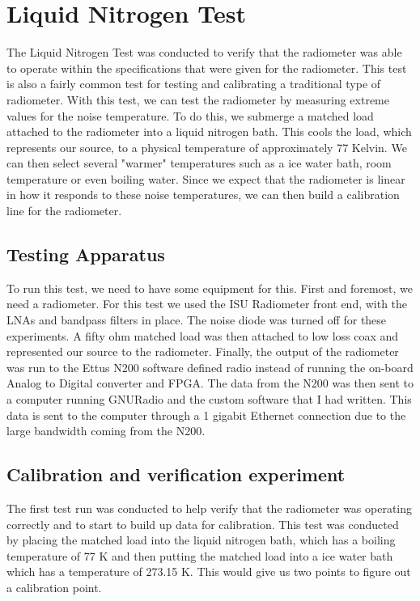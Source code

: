 \section{Liquid Nitrogen Test}
The Liquid Nitrogen Test was conducted to verify that the radiometer was able to operate within the specifications that were given for the radiometer.  This test is also a fairly common test for testing and calibrating a traditional type of radiometer.  With this test, we can test the radiometer by measuring extreme values for the noise temperature.  To do this, we submerge a matched load attached to the radiometer into a liquid nitrogen bath.  This cools the load, which represents our source, to a physical temperature of approximately 77 Kelvin.  We can then select several "warmer" temperatures such as a ice water bath, room temperature or even boiling water.  Since we expect that the radiometer is linear in how it responds to these noise temperatures, we can then build a calibration line for the radiometer.

\subsection{Testing Apparatus}
To run this test, we need to have some equipment for this.  First and foremost, we need a radiometer.  For this test we used the ISU Radiometer front end, with the LNAs and bandpass filters in place.  The noise diode was turned off for these experiments.  A fifty ohm matched load was then attached to low loss coax and represented our source to the radiometer.  Finally, the output of the radiometer was run to the Ettus N200 software defined radio instead of running the on-board Analog to Digital converter and FPGA.  The data from the N200 was then sent to a computer running GNURadio and the custom software that I had written.  This data is sent to the computer through a 1 gigabit Ethernet connection due to the large bandwidth coming from the N200.

\subsection{Calibration and verification experiment}
The first test run was conducted to help verify that the radiometer was operating correctly and to start to build up data for calibration.  This test was conducted by placing the matched load into the liquid nitrogen bath, which has a boiling temperature of 77 K and then putting the matched load into a ice water bath which has a temperature of 273.15 K.  This would give us two points to figure out a calibration point.

